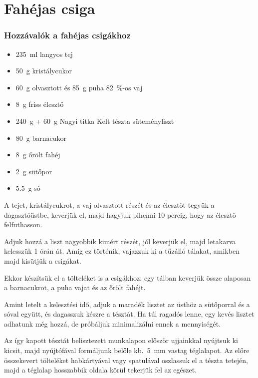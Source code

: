 \newpage
\section{Fahéjas csiga} \label{sec:fahejas-csiga}

\subsubsection*{Hozzávalók a fahéjas csigákhoz}
\begin{itemize}
    \item \qty{235}{\ml} langyos tej
    \item \qty{50}{\g} kristálycukor
    \item \qty{60}{\g} olvasztott és \qty{85}{\g} puha \qty{82}{\percent}-os vaj
    \item \qty{8}{\g} friss élesztő
    \item \qty{240}{\g} + \qty{60}{\g} Nagyi titka Kelt tészta süteményliszt
    \item \qty{80}{\g} barnacukor
    \item \qty{8}{\g} őrölt fahéj
    \item \qty{2}{\g} sütőpor
    \item \qty{5.5}{\g} só
\end{itemize}

A tejet, kristálycukrot, a vaj olvasztott részét és az élesztőt tegyük a dagasztóüstbe, keverjük el, majd hagyjuk pihenni \num{10} percig, hogy az élesztő felfuthasson.

Adjuk hozzá a liszt nagyobbik kimért részét, jól keverjük el, majd letakarva kelesszük \num{1} órán át. Amíg ez történik, vajazzuk ki a tűzálló tálakat, amikben majd kisütjük a csigákat.

Ekkor készítsük el a tölteléket is a csigákhoz: egy tálban keverjük össze alaposan a barnacukrot, a puha vajat és az őrölt fahéjt.

Amint letelt a kelesztési idő, adjuk a maradék lisztet az üsthöz a sütőporral és a sóval együtt, és dagasszuk készre a tésztát. Ha túl ragadós lenne, egy kevés lisztet adhatunk még hozzá, de próbáljuk minimalizálni ennek a mennyiségét.

Az így kapott tésztát belisztezett munkalapon először ujjainkkal nyújtsuk ki kicsit, majd nyújtófával formáljunk belőle kb.~\qty{5}{\mm} vastag téglalapot. Az előre összekevert tölteléket habkártyával vagy spatulával oszlassuk el a tészta tetején, majd a téglalap hosszabbik oldala körül tekerjük fel az egészet.

